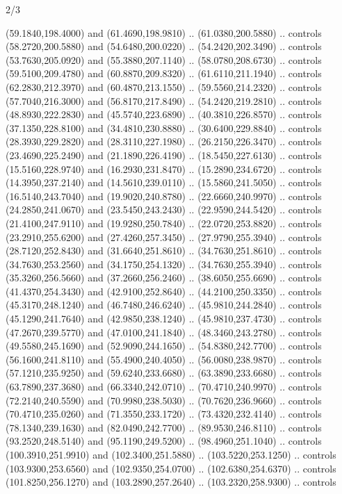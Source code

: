 \begin{flagdescription}{2/3}
\begin{scope}[shift={(0.5\flaglength,0.5)},scale=\flagwidth/480]
\begin{scope}[y=0.8pt, x=0.80pt, yscale=-1,shift={(-450,-300)}]
\begin{scope}[cm={{1.02948,0.0,0.0,1.02948,(-13.26599,6.99414)}}]
\begin{scope}[shift={(341.0917,90.34325)}]
  (59.1840,198.4000) and (61.4690,198.9810) .. (61.0380,200.5880) .. controls
  (58.2720,200.5880) and (54.6480,200.0220) .. (54.2420,202.3490) .. controls
  (53.7630,205.0920) and (55.3880,207.1140) .. (58.0780,208.6730) .. controls
  (59.5100,209.4780) and (60.8870,209.8320) .. (61.6110,211.1940) .. controls
  (62.2830,212.3970) and (60.4870,213.1550) .. (59.5560,214.2320) .. controls
  (57.7040,216.3000) and (56.8170,217.8490) .. (54.2420,219.2810) .. controls
  (48.8930,222.2830) and (45.5740,223.6890) .. (40.3810,226.8570) .. controls
  (37.1350,228.8100) and (34.4810,230.8880) .. (30.6400,229.8840) .. controls
  (28.3930,229.2820) and (28.3110,227.1980) .. (26.2150,226.3470) .. controls
  (23.4690,225.2490) and (21.1890,226.4190) .. (18.5450,227.6130) .. controls
  (15.5160,228.9740) and (16.2930,231.8470) .. (15.2890,234.6720) .. controls
  (14.3950,237.2140) and (14.5610,239.0110) .. (15.5860,241.5050) .. controls
  (16.5140,243.7040) and (19.9020,240.8780) .. (22.6660,240.9970) .. controls
  (24.2850,241.0670) and (23.5450,243.2430) .. (22.9590,244.5420) .. controls
  (21.4100,247.9110) and (19.9280,250.7840) .. (22.0720,253.8820) .. controls
  (23.2910,255.6200) and (27.4260,257.3450) .. (27.9790,255.3940) .. controls
  (28.7120,252.8430) and (31.6640,251.8610) .. (34.7630,251.8610) .. controls
  (34.7630,253.2560) and (34.1750,254.1320) .. (34.7630,255.3940) .. controls
  (35.3260,256.5660) and (37.2660,256.2460) .. (38.6050,255.6690) .. controls
  (41.4370,254.3430) and (42.9100,252.8640) .. (44.2100,250.3350) .. controls
  (45.3170,248.1240) and (46.7480,246.6240) .. (45.9810,244.2840) .. controls
  (45.1290,241.7640) and (42.9850,238.1240) .. (45.9810,237.4730) .. controls
  (47.2670,239.5770) and (47.0100,241.1840) .. (48.3460,243.2780) .. controls
  (49.5580,245.1690) and (52.9090,244.1650) .. (54.8380,242.7700) .. controls
  (56.1600,241.8110) and (55.4900,240.4050) .. (56.0080,238.9870) .. controls
  (57.1210,235.9250) and (59.6240,233.6680) .. (63.3890,233.6680) .. controls
  (63.7890,237.3680) and (66.3340,242.0710) .. (70.4710,240.9970) .. controls
  (72.2140,240.5590) and (70.9980,238.5030) .. (70.7620,236.9660) .. controls
  (70.4710,235.0260) and (71.3550,233.1720) .. (73.4320,232.4140) .. controls
  (78.1340,239.1630) and (82.0490,242.7700) .. (89.9530,246.8110) .. controls
  (93.2520,248.5140) and (95.1190,249.5200) .. (98.4960,251.1040) .. controls
  (100.3910,251.9910) and (102.3400,251.5880) .. (103.5220,253.1250) .. controls
  (103.9300,253.6560) and (102.9350,254.0700) .. (102.6380,254.6370) .. controls
  (101.8250,256.1270) and (103.2890,257.2640) .. (103.2320,258.9300) .. controls

\end{scope}
\end{scope}
\end{scope}
\end{scope}
\end{flagdescription}
